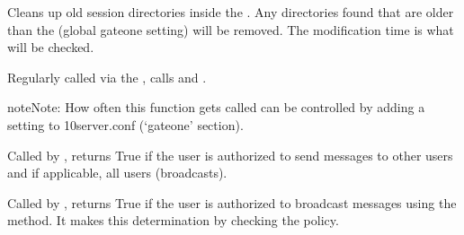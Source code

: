 \documentclass[letterpaper,10pt,openany]{sphinxmanual}
\begin{document}

\begin{fulllineitems}
\label{Developer/server:gateone.core.server.cleanup_old_sessions}
Cleans up old session directories inside the .  Any directories
found that are older than the  (global gateone setting) will
be removed.  The modification time is what will be checked.

\end{fulllineitems}


\begin{fulllineitems}
\label{Developer/server:gateone.core.server.clean_up}
Regularly called via the  , calls
{\hyperref[Developer/server:gateone.core.server.cleanup_user_logs]{}} and {\hyperref[Developer/server:gateone.core.server.cleanup_old_sessions]{}}.

\begin{notice}{note}{Note:}
How often this function gets called can be controlled by adding a
 setting to 10server.conf (`gateone' section).
\end{notice}

\end{fulllineitems}


\begin{fulllineitems}
\label{Developer/server:gateone.core.server.policy_send_user_message}
Called by {\hyperref[Developer/server:gateone.core.server.gateone_policies]{}}, returns True if the user is
authorized to send messages to other users and if applicable, all users
(broadcasts).

\end{fulllineitems}


\begin{fulllineitems}
\label{Developer/server:gateone.core.server.policy_broadcast}
Called by {\hyperref[Developer/server:gateone.core.server.gateone_policies]{}}, returns True if the user is
authorized to broadcast messages using the
 method.  It makes this determination
by checking the  policy.

\end{fulllineitems}
\end{document}
